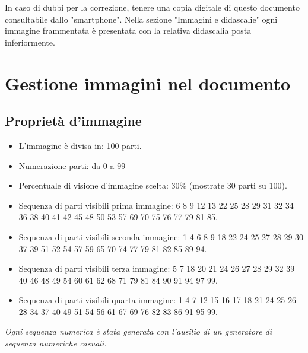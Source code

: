 \documentclass[hidelinks,12pt,a4paper]{article}
\begin{document}
	
	\vspace*{\fill}
	\centering
	\fboxrule=2pt
	\fbox
	{
		\begin{minipage}{\linewidth}
			In caso di dubbi per la correzione, tenere una copia digitale di questo documento consultabile dallo "smartphone". Nella sezione "Immagini e didascalie" ogni immagine frammentata è presentata con la relativa didascalia posta inferiormente.
		\end{minipage}
	}

	\newpage
	\section{Gestione immagini nel documento}
	
	\newline
	
	\subsection{Proprietà d'immagine}
	\begin{itemize}
		\item L'immagine è divisa in: 100 parti.
		\item Numerazione parti: da 0 a 99
		\item Percentuale di visione d'immagine scelta: 30\% (mostrate 30 parti su 100).
		\item Sequenza di parti visibili prima immagine:  6 8 9 12 13 22 25 28 29 31 32 34 36 38 40 41 42 45 48 50 53 57 69 70 75 76 77 79 81 85.
		\item Sequenza di parti visibili seconda immagine:  1 4 6 8 9 18 22 24 25 27 28 29 30 37 39 51 52 54 57 59 65 70 74 77 79 81 82 85 89 94.
		\item Sequenza di parti visibili terza immagine:  5 7 18 20 21 24 26 27 28 29 32 39 40 46 48 49 54 60 61 62 68 71 79 81 84 90 91 94 97 99.
		\item Sequenza di parti visibili quarta immagine:  1 4 7 12 15 16 17 18 21 24 25 26 28 34 37 40 49 51 54 56 61 67 69 76 82 83 86 91 95 99.
	\end{itemize}
	\textit{Ogni sequenza numerica è stata generata con l'ausilio di un generatore di sequenza numeriche casuali.}
\end{document}
